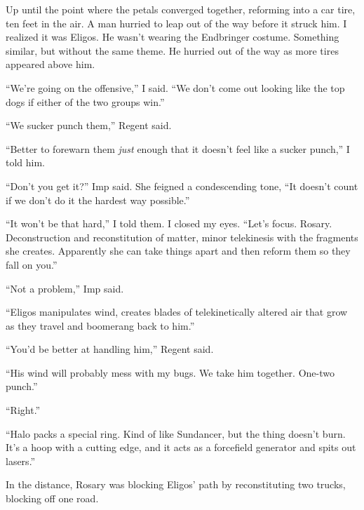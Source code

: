 Up until the point where the petals converged together, reforming into a car tire, ten feet in the air.  A man hurried to leap out of the way before it struck him.  I realized it was Eligos.  He wasn't wearing the Endbringer costume.  Something similar, but without the same theme.  He hurried out of the way as more tires appeared above him.



``We're going on the offensive,'' I said.  ``We don't come out looking like the top dogs if either of the two groups win.''



``We sucker punch them,'' Regent said.



``Better to forewarn them \emph{just} enough that it doesn't feel like a sucker punch,'' I told him.



``Don't you get it?'' Imp said.  She feigned a condescending tone, ``It doesn't count if we don't do it the hardest way possible.''



``It won't be that hard,'' I told them.  I closed my eyes.  ``Let's focus.  Rosary.  Deconstruction and reconstitution of matter, minor telekinesis with the fragments she creates.  Apparently she can take things apart and then reform them so they fall on you.''



``Not a problem,'' Imp said.



``Eligos manipulates wind, creates blades of telekinetically altered air that grow as they travel and boomerang back to him.''



``You'd be better at handling him,'' Regent said.



``His wind will probably mess with my bugs.  We take him together.  One-two punch.''



``Right.''



``Halo packs a special ring.  Kind of like Sundancer, but the thing doesn't burn.  It's a hoop with a cutting edge, and it acts as a forcefield generator and spits out lasers.''



In the distance, Rosary was blocking Eligos' path by reconstituting two trucks, blocking off one road.



